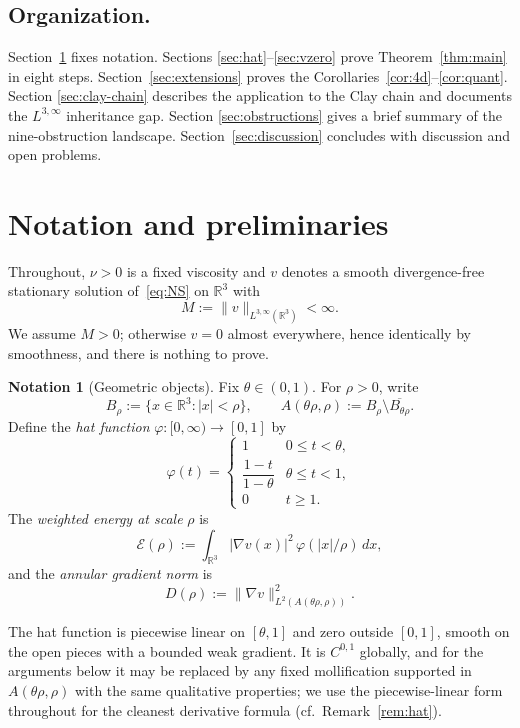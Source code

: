 \documentclass[11pt]{amsart}
\theoremstyle{definition}
\newtheorem{notation}[theorem]{Notation}
\newcommand{\RR}{\mathbb{R}}
\newcommand{\EE}{\mathcal{E}}    %
\newcommand{\DD}{D}              %
\newcommand{\Lweak}[1]{L^{3,\infty}(\RR^{#1})}
\newcommand{\norm}[1]{\|#1\|}
\newcommand{\abs}[1]{|#1|}
\begin{document}
\subsection{Organization.}

Section~\ref{sec:notation} fixes notation. Sections
\ref{sec:hat}--\ref{sec:vzero} prove Theorem~\ref{thm:main} in
eight steps. Section~\ref{sec:extensions} proves the
Corollaries~\ref{cor:4d}--\ref{cor:quant}. Section
\ref{sec:clay-chain} describes the application to the Clay chain
and documents the $L^{3,\infty}$ inheritance gap. Section
\ref{sec:obstructions} gives a brief summary of the
nine-obstruction landscape. Section~\ref{sec:discussion}
concludes with discussion and open problems.

\section{Notation and preliminaries}\label{sec:notation}

Throughout, $\nu > 0$ is a fixed viscosity and $v$ denotes a
smooth divergence-free stationary solution of~\eqref{eq:NS} on
$\RR^3$ with
\[
M := \norm{v}_{\Lweak{3}} < \infty.
\]
We assume $M > 0$; otherwise $v = 0$ almost everywhere, hence
identically by smoothness, and there is nothing to prove.

\begin{notation}[Geometric objects]\label{not:geometry}
Fix $\theta \in (0, 1)$. For $\rho > 0$, write
\[
B_\rho := \{x \in \RR^3 : \abs{x} < \rho\},\qquad
A(\theta\rho, \rho) := B_\rho \setminus \overline{B_{\theta\rho}}.
\]
Define the \emph{hat function} $\varphi \colon [0, \infty) \to
[0, 1]$ by
\[
\varphi(t) = \begin{cases}
1 & 0 \leq t < \theta, \\
\dfrac{1 - t}{1 - \theta} & \theta \leq t < 1, \\
0 & t \geq 1.
\end{cases}
\]
The \emph{weighted energy at scale} $\rho$ is
\[
\EE(\rho) := \int_{\RR^3} \abs{\nabla v(x)}^2\, \varphi(\abs{x}/\rho)\, dx,
\]
and the \emph{annular gradient norm} is
\[
\DD(\rho) := \norm{\nabla v}_{L^2(A(\theta\rho, \rho))}^2.
\]
\end{notation}

The hat function is piecewise linear on $[\theta, 1]$ and zero
outside $[0, 1]$, smooth on the open pieces with a bounded weak
gradient. It is $C^{0,1}$ globally, and for the arguments below
it may be replaced by any fixed mollification supported in
$A(\theta\rho, \rho)$ with the same qualitative properties; we
use the piecewise-linear form throughout for the cleanest
derivative formula (cf.\ Remark~\ref{rem:hat}).
\end{document}
